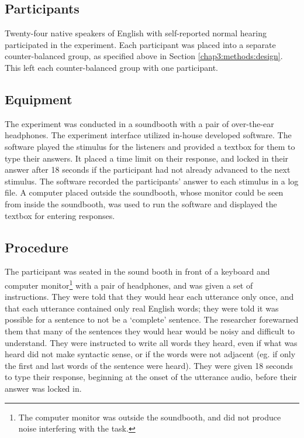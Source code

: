 \subsection{Participants}
\label{chap3:methods:participants}

Twenty-four native speakers of English with self-reported normal hearing participated in the experiment. Each participant was placed into a separate counter-balanced group, as specified above in Section \ref{chap3:methods:design}.  This left each counter-balanced group with one participant.

\subsection{Equipment}
\label{chap3:methods:equipment}

The experiment was conducted in a soundbooth with a pair of over-the-ear headphones.  The experiment interface utilized in-house developed software.  The software played the stimulus for the listeners and provided a textbox for them to type their answers.  It placed a time limit on their response, and locked in their answer after 18 seconds if the participant had not already advanced to the next stimulus. The software recorded the participants' answer to each stimulus in a log file.  A computer placed outside the soundbooth, whose monitor could be seen from inside the soundbooth, was used to run the software and displayed the textbox for entering responses.

\subsection{Procedure}
\label{chap3:methods:procedure}

The participant was seated in the sound booth in front of a keyboard and computer monitor\footnote{The computer monitor was outside the soundbooth, and did not produce noise interfering with the task.} with a pair of headphones, and was given a set of instructions. They were told that they would hear each utterance only once, and that each utterance contained only real English words; they were told it was possible for a sentence to not be a `complete' sentence.  The researcher forewarned them that many of the sentences they would hear would be noisy and difficult to understand. They were instructed to write all words they heard, even if what was heard did not make syntactic sense, or if the words were not adjacent (eg. if only the first and last words of the sentence were heard). They were given 18 seconds to type their response, beginning at the onset of the utterance audio, before their answer was locked in.

